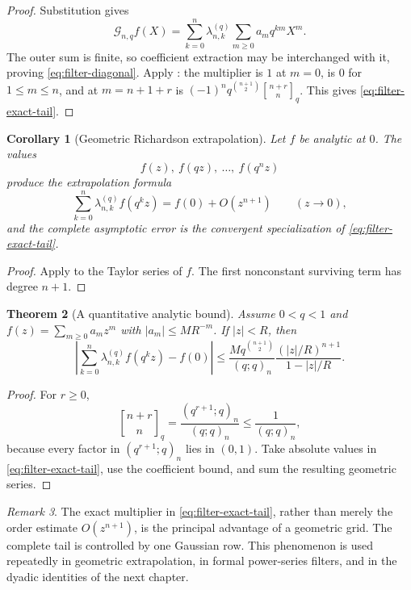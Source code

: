 \documentclass[11pt,oneside,openany]{book}
\newtheorem{theorem}{Theorem}[chapter]
\newtheorem{corollary}[theorem]{Corollary}
\theoremstyle{definition}
\theoremstyle{remark}
\newtheorem{remark}[theorem]{Remark}
\newcommand{\Qbinom}[3]{\genfrac{[}{]}{0pt}{}{#1}{#2}_{#3}}
\newcommand{\abs}[1]{\lvert #1\rvert}
\begin{document}
\begin{proof}
Substitution gives
\[
 \mathcal G_{n,q}f(X)
 =\sum_{k=0}^{n}\lambda_{n,k}^{(q)}
   \sum_{m\ge0}a_mq^{km}X^m.
\]
The outer sum is finite, so coefficient extraction may be interchanged with it, proving \eqref{eq:filter-diagonal}.  Apply : the multiplier is $1$ at $m=0$, is $0$ for $1\le m\le n$, and at $m=n+1+r$ is
$(-1)^nq^{\binom{n+1}{2}}\Qbinom{n+r}{n}{q}$.  This gives \eqref{eq:filter-exact-tail}.
\end{proof}

\begin{corollary}[Geometric Richardson extrapolation]\label{cor:geometric-richardson}
Let $f$ be analytic at $0$.  The values
\[
 f(z),\ f(qz),\ \ldots,\ f(q^nz)
\]
produce the extrapolation formula
\[
 \sum_{k=0}^{n}\lambda_{n,k}^{(q)}f(q^kz)
 =f(0)+O(z^{n+1})
 \qquad(z\to0),
\]
and the complete asymptotic error is the convergent specialization of
\eqref{eq:filter-exact-tail}.
\end{corollary}

\begin{proof}
Apply  to the Taylor series of $f$.  The first nonconstant surviving term has degree $n+1$.
\end{proof}

\begin{theorem}[A quantitative analytic bound]\label{thm:geometric-filter-bound}
Assume $0<q<1$ and
$f(z)=\sum_{m\ge0}a_mz^m$ with
$\abs{a_m}\le M R^{-m}$.  If $\abs z<R$, then
\begin{equation}\label{eq:geometric-filter-bound}
 \left|\sum_{k=0}^{n}\lambda_{n,k}^{(q)}f(q^kz)-f(0)\right|
 \le
 \frac{M q^{\binom{n+1}{2}}}{(q;q)_n}
 \frac{(\abs z/R)^{n+1}}{1-\abs z/R}.
\end{equation}
\end{theorem}

\begin{proof}
For $r\ge0$,
\[
 \Qbinom{n+r}{n}{q}
 =\frac{(q^{r+1};q)_n}{(q;q)_n}
 \le\frac1{(q;q)_n},
\]
because every factor in $(q^{r+1};q)_n$ lies in $(0,1)$.  Take absolute values in \eqref{eq:filter-exact-tail}, use the coefficient bound, and sum the resulting geometric series.
\end{proof}

\begin{remark}
The exact multiplier in \eqref{eq:filter-exact-tail}, rather than merely the order estimate $O(z^{n+1})$, is the principal advantage of a geometric grid.  The complete tail is controlled by one Gaussian row.  This phenomenon is used repeatedly in geometric extrapolation, in formal power-series filters, and in the dyadic identities of the next chapter.
\end{remark}
\end{document}
